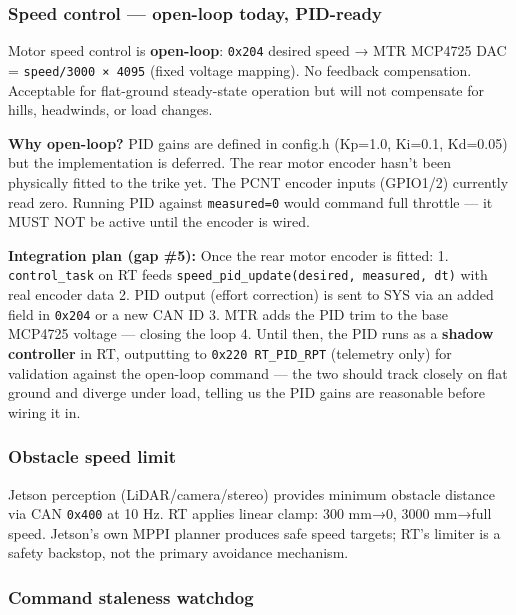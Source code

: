 \documentclass[12pt,a4paper,oneside]{report}
\begin{document}
\subsubsection{Speed control --- open-loop today,
PID-ready}\label{speed-control-open-loop-today-pid-ready}

Motor speed control is \textbf{open-loop}: \texttt{0x204} desired speed → MTR
MCP4725 DAC = \texttt{speed/3000\ ×\ 4095} (fixed voltage mapping). No feedback
compensation. Acceptable for flat-ground steady-state operation but will not
compensate for hills, headwinds, or load changes.

\textbf{Why open-loop?} PID gains are defined in config.h (Kp=1.0, Ki=0.1,
Kd=0.05) but the implementation is deferred. The rear motor encoder hasn't been
physically fitted to the trike yet. The PCNT encoder inputs (GPIO1/2) currently
read zero. Running PID against \texttt{measured=0} would command full throttle
--- it MUST NOT be active until the encoder is wired.

\textbf{Integration plan (gap \#5):} Once the rear motor encoder is fitted: 1.
\texttt{control\_task} on RT feeds
\texttt{speed\_pid\_update(desired,\ measured,\ dt)} with real encoder data 2.
PID output (effort correction) is sent to SYS via an added field in
\texttt{0x204} or a new CAN ID 3. MTR adds the PID trim to the base MCP4725
voltage --- closing the loop 4. Until then, the PID runs as a \textbf{shadow
controller} in RT, outputting to \texttt{0x220\ RT\_PID\_RPT} (telemetry only)
for validation against the open-loop command --- the two should track closely on
flat ground and diverge under load, telling us the PID gains are reasonable
before wiring it in.

\subsubsection{Obstacle speed limit}\label{obstacle-speed-limit}

Jetson perception (LiDAR/camera/stereo) provides minimum obstacle distance via
CAN \texttt{0x400} at 10 Hz. RT applies linear clamp: 300 mm→0, 3000 mm→full
speed. Jetson's own MPPI planner produces safe speed targets; RT's limiter is a
safety backstop, not the primary avoidance mechanism.

\subsubsection{Command staleness watchdog}\label{command-staleness-watchdog}
\end{document}
